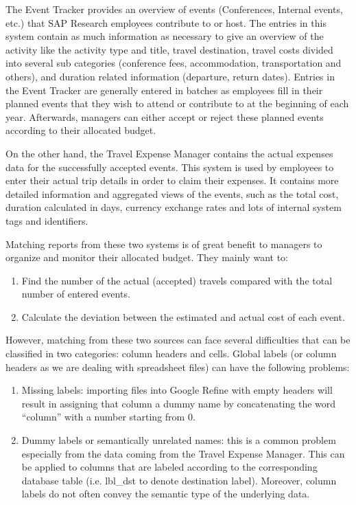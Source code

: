 \documentclass{../../Util/LaTEX/sig-alternate}
\begin{document}
The Event Tracker provides an overview of events (Conferences, Internal events, etc.) that SAP Research employees contribute to or host. The entries in this system contain as much information as necessary to give an overview of the activity like the activity type and title, travel destination, travel costs divided into several sub categories (conference fees, accommodation, transportation and others), and duration related information (departure, return dates). Entries in the Event Tracker are generally entered in batches as employees fill in their planned events that they wish to attend or contribute to at the beginning of each year. Afterwards, managers can either accept or reject these planned events according to their allocated budget.

On the other hand, the Travel Expense Manager contains the actual expenses data for the successfully accepted events. This system is used by employees to enter their actual trip details in order to claim their expenses. It contains more detailed information and aggregated views of the events, such as the total cost, duration calculated in days, currency exchange rates and lots of internal system tags and identifiers.

Matching reports from these two systems is of great benefit to managers to organize and monitor their allocated budget. They mainly want to:

\begin{enumerate}
\item  Find the number of the actual (accepted) travels compared with the total number of entered events.

\item  Calculate the deviation between the estimated and actual cost of each event.
\end{enumerate}

However, matching from these two sources can face several difficulties that can be classified in two categories: column headers and cells. Global labels (or column headers as we are dealing with spreadsheet files) can have the following problems:

\begin{enumerate}
\item  Missing labels: importing files into Google Refine with empty headers will result in assigning that column a dummy name by concatenating the word ``column'' with a number starting from 0.

\item  Dummy labels or semantically unrelated names: this is a common problem especially from the data coming from the Travel Expense Manager. This can be applied to columns that are labeled according to the corresponding database table (i.e. lbl\_dst to denote destination label). Moreover, column labels do not often convey the semantic type of the underlying data.
\end{enumerate}
\end{document}
